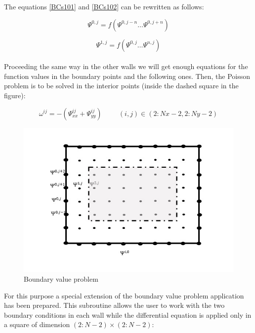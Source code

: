 The equations \ref{BCs101} and \ref{BCs102} can be rewritten as follows: 

\begin{equation} \label{BCs103}
 \Psi^{0,j} = f(\Psi^{0,j-n} \ldots \Psi^{0,j+n})
\end{equation}

\begin{equation} \label{BCs104}
 \Psi^{1,j}= f(\Psi^{0,j}  \ldots \Psi^{n,j} )
\end{equation}\\

Proceeding the same way in the other walls we will get enough equations for the
function values in the boundary points and the following ones. Then, the Poisson
problem is to be solved in the interior points (inside the dashed square in the
figure):

\begin {equation} \label{cont5}
\omega^{ij}= - (\Psi^{ij} _{xx} + \Psi^{ij} _{yy}) \hspace{1cm} (i,j) \in
(2:Nx-2, 2:Ny-2)
\end{equation}

\begin{figure}[h]
\centering
\includegraphics[scale=1, trim = 5mm 10mm 10mm 0mm, clip]{./Figures/4-IVBP/figure_3.jpg}
\caption{Boundary value problem}
\label{BVP}
\end{figure}

For this purpose a special extension of the boundary value problem application
has been prepared. This subroutine allows the user to work with the two boundary
conditions in each wall while the differential equation is applied only in a
square of dimension $(2:N-2)\times(2:N-2)$: 

